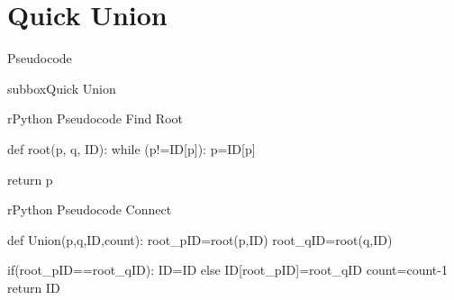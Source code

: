 \documentclass[10pt,a4paper]{article}
\begin{document}
\section*{Quick Union}
\begin{textbox}{Pseudocode}
\begin{subbox}{subbox}{Quick Union}
\begin{codebox}{r}{Python Pseudocode Find Root}

def root(p, q, ID):
    while (p!=ID[p]):
	    p=ID[p]

    return p 


\end{codebox}


\begin{codebox}{r}{Python Pseudocode Connect}

def Union(p,q,ID,count):
	root_pID=root(p,ID)
	root_qID=root(q,ID)

	if(root_pID==root_qID):
		ID=ID
	else
    	ID[root_pID]=root_qID
    	count=count-1
	return ID


\end{codebox}
\end{subbox}
\end{textbox}
\end{document}
